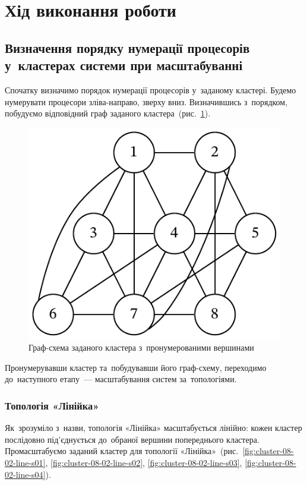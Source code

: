 \documentclass[
	a4paper,
	oneside,
	BCOR = 10mm,
	DIV = 12,
	12pt,
	headings = normal,
]{scrartcl}
\begin{document}
	\section{Хід виконання роботи}
		\subsection{Визначення порядку нумерації процесорів у~кластерах системи при масштабуванні}
		\label{ssec:scaling}
			Спочатку визначимо порядок нумерації процесорів у~заданому кластері. Будемо нумерувати процесори зліва-направо, зверху вниз. Визначившись з~порядком, побудуємо відповідний граф заданого кластера~(рис.~\ref{fig:cluster-08-01-named}).

			\begin{figure}[!htbp]
				\centering
				\includegraphics[height=7\baselineskip]{./assets/cluster-08-01-named.pdf}
				\caption{Граф-схема заданого кластера з~пронумерованими вершинами}
				\label{fig:cluster-08-01-named}
			\end{figure}

			Пронумерувавши кластер та~побудувавши його граф-схему, переходимо до~наступного етапу~— масштабування систем за~топологіями.

			\subsubsection{Топологія «Лінійка»}
				Як~зрозуміло з~назви, топологія «Лінійка» масштабується лінійно: кожен кластер послідовно під'єднується до~обраної вершини попереднього кластера. Промасштабуємо заданий кластер для топології «Лінійка»~(рис.~\ref{fig:cluster-08-02-line-s01}, \ref{fig:cluster-08-02-line-s02}, \ref{fig:cluster-08-02-line-s03}, \ref{fig:cluster-08-02-line-s04}).
\end{document}

